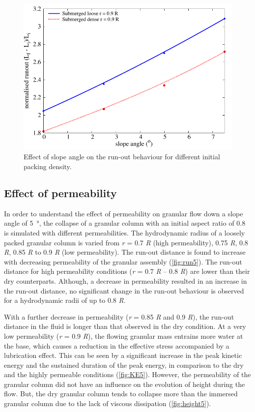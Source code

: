 \begin{figure}
\centering
\includegraphics[width=0.97\columnwidth]{slope_runout}
\caption{Effect of slope angle on the run-out behaviour for different initial 
packing density.}
\label{fig:slope_runout}
\end{figure}

\clearpage

\subsection{Effect of permeability}

In order to understand the effect of permeability on granular flow down a slope 
angle of \SI{5}{\degree}, the collapse of a granular column with an initial 
aspect ratio of 0.8 is simulated with different permeabilities. The 
hydrodynamic radius of a loosely packed granular column is varied from 
\textit{r} = 0.7 \textit{R} (high permeability), 0.75 \textit{R}, 0.8 
\textit{R}, 0.85 \textit{R} to 0.9 \textit{R} (low permeability). The run-out 
distance is found to increase with decreasing permeability of the granular 
assembly (\cref{fig:run5}). The run-out distance for high permeability 
conditions (\textit{r} = 0.7 \textit{R} -- 0.8 \textit{R}) are lower than their 
dry counterparts. Although, a decrease in permeability resulted in an increase 
in the run-out distance, no significant change in the run-out behaviour is 
observed for a hydrodynamic radii of up to 0.8 \textit{R}.

With a further decrease in permeability (\textit{r} = 0.85 \textit{R} and 0.9 
\textit{R}), the run-out 
distance in the fluid is longer than that observed in the dry 
condition. At a very low permeability (\textit{r} = 0.9 \textit{R}), the 
flowing granular mass
entrains more water at the base, which causes a reduction in the effective 
stress accompanied by a lubrication effect. This can be seen by a significant 
increase in the peak kinetic energy and the sustained duration of the peak 
energy, in comparison to the dry and the highly permeable conditions 
(\cref{fig:KE5}). However, the permeability of the granular column did not have 
an influence on the evolution of height during the flow. But, the dry granular 
column tends to collapse more than the immersed granular column due to the lack 
of viscous dissipation (\cref{fig:height5}).

